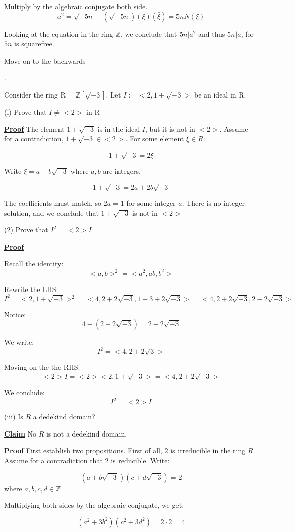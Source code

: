 \documentclass{article}
\newcommand{\new}[1]{
    \vspace{2mm}
    \noindent
    \textbf{
    \underline{#1}}
}
\newcounter{problemcnt}
\newcommand{\Problem}{{
    \vspace{5mm}
    \stepcounter{problemcnt}
    \noindent
    \arabic{problemcnt}. 
}
}
\newcommand{\Proof}{{
    \vspace{2mm}
    \noindent
    \textbf{
    \underline{Proof}}
}
}
\begin{document}
Multiply by the algebraic conjugate both side.
\[
    a^2 = \sqrt{-5n}-(\sqrt{-5n})(\xi)(\bar{\xi}) = 5nN(\xi)
\]

Looking at the equation in the ring $\mathbb{Z}$,
we conclude that $5n|a^2$ and thus $5n|a$, for $5n$ is squarefree. 

Move on to the backwards 

\newpage
\Problem
Consider the ring R = $\mathbb{Z}
[\sqrt{-3}]$. Let 
$I:=<2, 1+\sqrt{-3}>$ be an ideal in R.

\vspace{2mm}
(i) Prove that $I\neq<2>$ in R 

\Proof The element $1 + \sqrt{-3}$ 
is in the ideal $I$, but it is not in 
$<2>$. Assume for a contradiction, 
$1+\sqrt{-3} \in <2>$. For some element 
$\xi \in R$:

\[
    1+\sqrt{-3} = 2\xi
\]

Write $\xi = a+b\sqrt{-3}$ where $a, b$ are 
integers. 

\[
   1+\sqrt{-3} = 2a+2b\sqrt{-3} 
\]

The coefficients must match, so 
$2a = 1$ for some integer $a$. There is 
no integer solution, and we conclude 
that $1+\sqrt{-3}$ is not in $<2>$


(2) Prove that $I^2 = <2>I$

\Proof
Recall the identity:
\[
    <a, b>^2 = <a^2, ab, b^2>
\]

Rewrite the LHS:
\[
    I^2 = <2, 1+\sqrt{-3}>^2
    =<4, 2+2\sqrt{-3}, 1-3+2\sqrt{-3}>
    =<4, 2+2\sqrt{-3}, 2-2\sqrt{-3}>
\]

Notice:
\[
    4-(2+2\sqrt{-3}) = 2-2\sqrt{-3}
\]

We write:
\[
    I^2 = <4, 2+2\sqrt{3}>
\]

Moving on the the RHS:
\[
    <2>I = <2><2, 1+\sqrt{-3}> = <4, 2+2\sqrt{-3}>
\]

We conclude:
\[
    I^2 = <2>I
\]

(iii) Is $R$ a dedekind domain?

\new{Claim} No $R$ is not a dedekind domain.

\Proof First establish two propositions. 
First of all, $2$ is irreducible in the 
ring $R$. Assume for a contradiction that 
$2$ is reducible. Write:

\[
    (a + b\sqrt{-3}) 
    (c + d\sqrt{-3})
    = 2
\]
where $a, b, c, d \in \mathbb{Z}$

Multiplying both sides by the algebraic 
conjugate, we get:

\[
    (a^2+3b^2)(c^2+3d^2) = 2 \cdot
    \bar{2} = 4
\]
\end{document}
